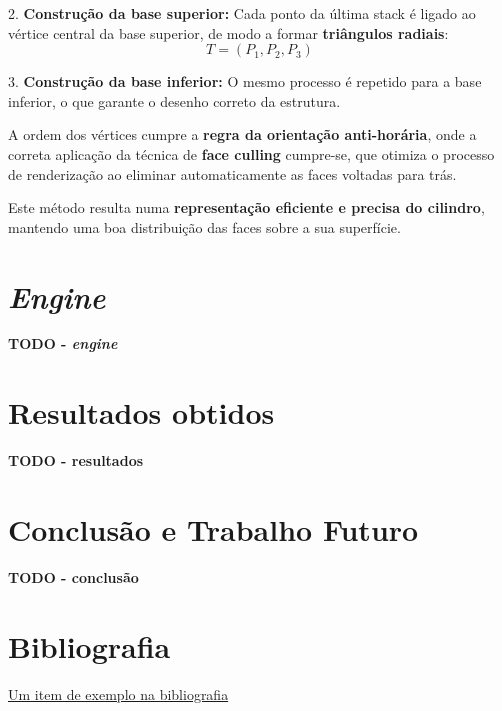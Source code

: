 \documentclass[12pt, a4paper]{article}
\begin{document}
2. \textbf{Construção da base superior:}
Cada ponto da última stack é ligado ao vértice central da base superior, de modo a formar
\textbf{triângulos radiais}:
\[
T = (P_1, P_2, P_3)
\]

3. \textbf{Construção da base inferior:}
O mesmo processo é repetido para a base inferior, o que garante o desenho correto da estrutura.

A ordem dos vértices cumpre a \textbf{regra da orientação anti-horária}, onde a correta
aplicação da técnica de \textbf{face culling} cumpre-se, que otimiza o processo de renderização
ao eliminar automaticamente as faces voltadas para trás.

Este método resulta numa \textbf{representação eficiente e precisa do cilindro}, mantendo uma boa
distribuição das faces sobre a sua superfície.

\section{\emph{Engine}}

\textbf{\color{red} TODO - \emph{engine}}

\section{Resultados obtidos}

\textbf{\color{red} TODO - resultados}

\section{Conclusão e Trabalho Futuro}

\textbf{\color{red} TODO - conclusão}

\begingroup
\section{Bibliografia}
\renewcommand{\section}[2]{}

\begin{thebibliography}{9}
        \href{https://youtu.be/dQw4w9WgXcQ}{Um item de exemplo na bibliografia}
\end{thebibliography}
\endgroup
\end{document}
